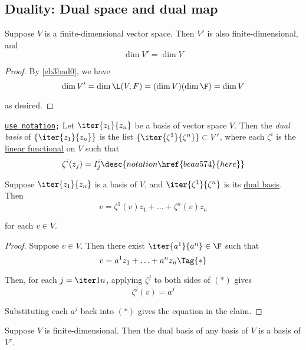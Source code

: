 \subsection{Duality: Dual space and dual map}\label{b2f82d2}

\label{eae973c}

Suppose $V$ is a finite-dimensional vector space. Then $V'$ is also
finite-dimensional, and
$$
  \dim V'=\dim V
$$

\begin{proof}
  By \autoref{eb3bad0}, we have
  $$
    \dim V'=\dim\L(V,F)=(\dim V)(\dim\F)=\dim V
  $$

  as desired.
\end{proof}

\label{f56d946}

\texttt{\href{beaa574}{use notation};} Let $\iter{z_1}{z_n}$ be a basis of
vector space $V$. Then the \textit{dual basis} of $\{\iter{z_1}{z_n}\}$ is the
list $\{\iter{\zeta^1}{\zeta^n}\}\subset V'$, where each $\zeta^i$ is the
\href{b0b1db8}{linear functional} on $V$ such that
$$
  \zeta^i(z_j)=I^i_j\desc{notation \href{beaa574}{here}}
$$

\label{c157fd5}

Suppose $\iter{z_1}{z_n}$ is a basis of $V$, and $\iter{\zeta^1}{\zeta^n}$ is
its \href{f56d946}{dual basis}. Then
$$
  v=\zeta^1(v)z_1+\ldots+\zeta^n(v)z_n
$$

for each $v\in V$.

\begin{proof}
  Suppose $v\in V$. Then there exist $\iter{a^1}{a^n}\in\F$ such that
  \begin{equation*}
    v=a^1z_1+\ldots+a^nz_n\Tag{*}
  \end{equation*}

  Then, for each $j=\iter1n$, applying $\zeta^j$ to both sides of $(*)$ gives
  $$
    \zeta^j(v)=a^j
  $$

  Substituting each $a^j$ back into $(*)$ gives the equation in the claim.
\end{proof}

\label{f9d48fe}

Suppose $V$ is finite-dimensional. Then the dual basis of any basis of $V$ is a
basis of $V'$.

